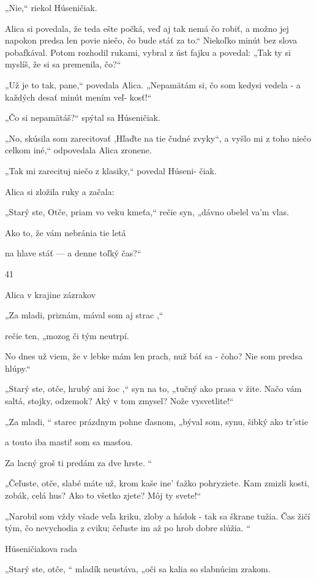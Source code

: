 \documentclass[12pt]{book}
\begin{document}
\begin{Parallel}[p]{}{}
{„Nie,“ riekol Húseničiak.

Alica si povedala, že teda ešte počká, veď aj tak nemá čo
robiť, a možno jej napokon predsa len povie niečo, čo bude
stáť za to.“ Niekoľko minút bez slova pobafkával. Potom
rozhodil rukami, vybral z úst fajku a povedal: „Tak ty si
myslíš, že si sa premenila, čo?“

„Už je to tak, pane,“ povedala Alica. „Nepamätám si, čo
som kedysi vedela - a každých desať minút mením veľ-
kosť!“

„Čo si nepamätáš?“ spýtal sa Húseničiak.

„No, skúsila som zarecitovať ,Hľaďte na tie čudné zvyky“,
a vyšlo mi z toho niečo celkom iné,“ odpovedala Alica
zronene.

„Tak mi zarecituj niečo z klasiky,“ povedal Húseni-
čiak.

Alica si zložila ruky a začala:

„Starý ste, Otče, priam vo veku kmeťa,“
rečie syn, „dávno obelel va'm vlas.

Ako to, že vám nebránia tie letá

na hlave stáť — a denne toľký čas?“

41

Alica v krajine zázrakov

   

„Za mladi, priznám, mával som aj strac ,“

rečie ten, „mozog či tým neutrpí.

No dnes už viem, že v lebke mám len prach,
nuž báť sa - čoho? Nie som predsa hlúpy.“

„Starý ste, otče, hrubý ani žoc ,“
syn na to, „tučný ako prasa v žite.
Načo vám saltá, stojky, odzemok?
Aký v tom zmysel? Nože vysvetlite!“

„Za mladi, “ starec prázdnym pohne ďasnom,
„býval som, synu, šibký ako tr'stie

a touto iba masti! som sa masťou.

Za lacný groš ti predám za dve hrste. “

„Čeľuste, otče, slabé máte už,
krom kaše ine' ťažko pohryziete.
Kam zmizli kosti, zobák, celá hus?
Ako to všetko zjete? Môj ty svete!“

„Narobil som vždy všade veľa kriku,
zloby a hádok - tak sa škrane tužia.
Čas žičí tým, čo nevychodia z cviku;
čeľuste im až po hrob dobre slúžia. “

Húseničiakova rada

„Starý ste, otče, “ mladík neustáva,
„oči sa kalia so slabnúcim zrakom.

}
\end{Parallel}
\end{document}
